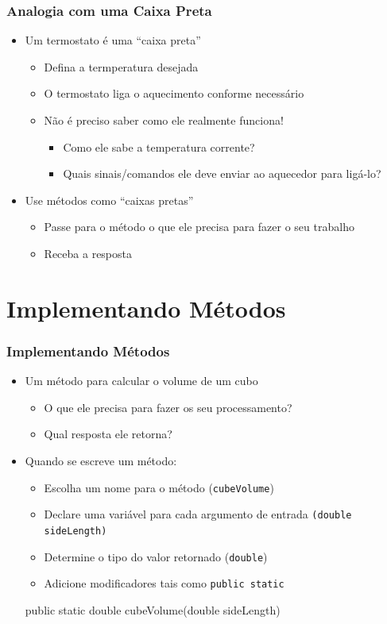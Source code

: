 \documentclass[xcolor={dvipsnames,table},aspectratio=169]{beamer}
\begin{document}
\begin{frame}\frametitle{Analogia com uma Caixa Preta}
\begin{itemize}
	\item Um termostato é uma ``caixa preta''
	\begin{itemize}
		\item Defina a termperatura desejada
		\item O termostato liga o aquecimento conforme necessário
		\item Não é preciso saber como ele realmente funciona!
		\begin{itemize}
			\item Como ele sabe a temperatura corrente?
			\item Quais sinais/comandos ele deve enviar ao aquecedor para ligá-lo?
		\end{itemize}
	\end{itemize}
	\item Use métodos como ``caixas pretas''
	\begin{itemize}
		\item Passe para o método o que ele precisa para fazer o seu trabalho
		\item Receba a resposta
	\end{itemize}
\end{itemize}
\end{frame}

\section{Implementando Métodos}

\begin{frame}[fragile]\frametitle{Implementando Métodos}
\begin{itemize}
	\item Um método para calcular o volume de um cubo
	\begin{itemize}
		\item O que ele precisa para fazer os seu processamento?
		\item Qual resposta ele retorna?
	\end{itemize}
	\item Quando se escreve um método:
	\begin{itemize}
		\item Escolha um nome para o método (\texttt{cubeVolume})
		\item Declare uma variável para cada argumento de entrada \texttt{(double sideLength)}
		\item Determine o tipo do valor retornado (\texttt{double})
		\item Adicione modificadores tais como \texttt{public static}
	\end{itemize}
\begin{javacode}
public static double cubeVolume(double sideLength)
\end{javacode}
\end{itemize}
\end{frame}
\end{document}
